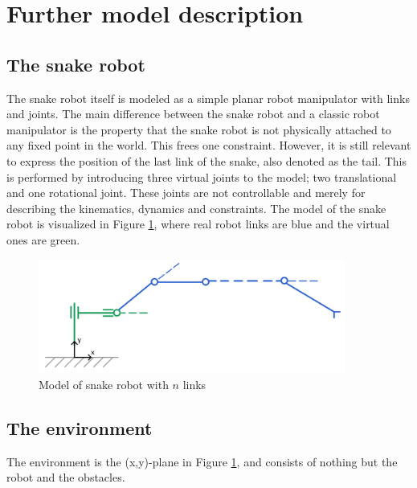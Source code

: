 
\section{Further model description}

\subsection{The snake robot}
The snake robot itself is modeled as a simple planar robot manipulator with links and joints. The main difference between the snake robot and a classic robot manipulator is the property that the snake robot is not physically attached to any fixed point in the world. This frees one constraint. However, it is still relevant to express the position of the last link of the snake, also denoted as the tail. This is performed by introducing three virtual joints to the model; two translational and one rotational joint. These joints are not controllable and merely for describing the kinematics, dynamics and constraints. The model of the snake robot is visualized in Figure \ref{fig:2_kin}, where real robot links are blue and the virtual ones are green.

\begin{figure}
    \centering
    \includegraphics[width=0.9\textwidth]{figures/kinematics_noname.PNG}
    \caption{Model of snake robot with $n$ links}
    \label{fig:2_kin}
\end{figure}


\subsection{The environment}
The environment is the (x,y)-plane in Figure \ref{fig:2_kin}, and consists of nothing but the robot and the obstacles.

